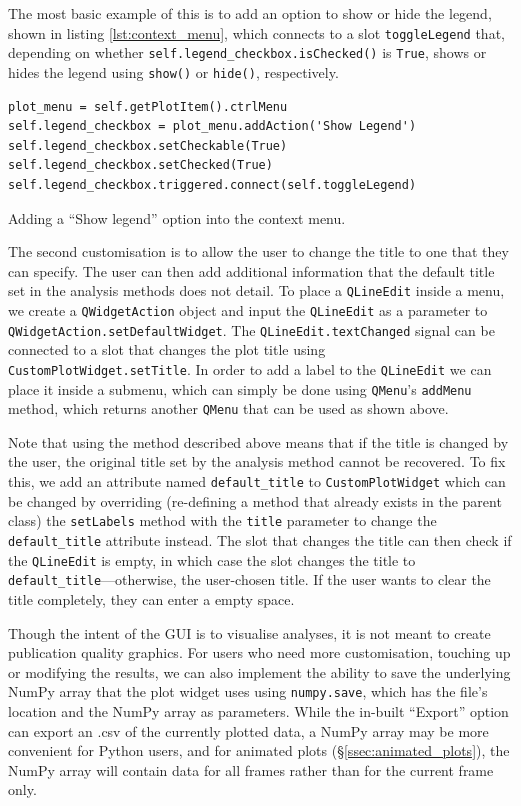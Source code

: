 \documentclass[12pt]{article}
\newenvironment{code}{\captionsetup{type=listing}}{\par\addvspace{\baselineskip}}
\begin{document}
The most basic example of this is to add an option to show or hide the legend, shown in listing \ref{lst:context_menu}, which connects to a slot \texttt{toggleLegend} that, depending on whether \texttt{self.legend_checkbox.isChecked()} is \texttt{True}, shows or hides the legend using \texttt{show()} or \texttt{hide()}, respectively.

\begin{code}\begin{verbatim}
plot_menu = self.getPlotItem().ctrlMenu
self.legend_checkbox = plot_menu.addAction('Show Legend')
self.legend_checkbox.setCheckable(True)
self.legend_checkbox.setChecked(True)
self.legend_checkbox.triggered.connect(self.toggleLegend)
\end{verbatim}
\caption{Adding a ``Show legend'' option into the context menu.}
\label{lst:context_menu}
\end{code}

The second customisation is to allow the user to change the title to one that they can specify. The user can then add additional information that the default title set in the analysis methods does not detail. To place a \texttt{QLineEdit} inside a menu, we create a \texttt{QWidgetAction} object and input the \texttt{QLineEdit} as a parameter to \texttt{QWidgetAction.setDefaultWidget}. The \texttt{QLineEdit.textChanged} signal can be connected to a slot that changes the plot title using \texttt{CustomPlotWidget.setTitle}. In order to add a label to the \texttt{QLineEdit} we can place it inside a submenu, which can simply be done using \texttt{QMenu}'s \texttt{addMenu} method, which returns another \texttt{QMenu} that can be used as shown above.

Note that using the method described above means that if the title is changed by the user, the original title set by the analysis method cannot be recovered. To fix this, we add an attribute named \texttt{default\_title} to \texttt{CustomPlotWidget} which can be changed by overriding (re-defining a method that already exists in the parent class) the \texttt{setLabels} method with the \texttt{title} parameter to change the \texttt{default\_title} attribute instead. The slot that changes the title can then check if the \texttt{QLineEdit} is empty, in which case the slot changes the title to \texttt{default\_title}---otherwise, the user-chosen title. If the user wants to clear the title completely, they can enter a empty space.

Though the intent of the GUI is to visualise analyses, it is not meant to create publication quality graphics. For users who need more customisation, touching up or modifying the results, we can also implement the ability to save the underlying NumPy array that the plot widget uses using \texttt{numpy.save}, which has the file's location and the NumPy array as parameters. While the in-built ``Export'' option can export an .csv of the currently plotted data, a NumPy array may be more convenient for Python users, and for animated plots (\S\ref{ssec:animated_plots}), the NumPy array will contain data for all frames rather than for the current frame only.
\end{document}
